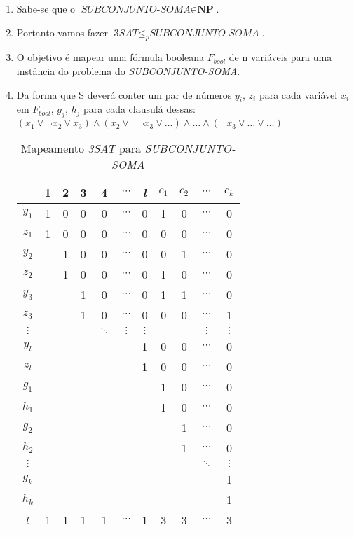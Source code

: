 \documentclass[12pt, a4paper]{article}
\begin{document}
\begin{enumerate}
  \item Sabe-se que o $\textit{SUBCONJUNTO-SOMA} \in \textbf{NP}$.
  \item Portanto vamos fazer $\textit{3SAT} \leqslant_{p} \textit{SUBCONJUNTO-SOMA}$.
  \item O objetivo é mapear uma fórmula booleana $F_{bool}$ de n variáveis para uma instância do problema do \textit{SUBCONJUNTO-SOMA}.
  \item Da forma que S deverá conter um par de números $y_i$, $z_i$ para cada variável $x_i$ em $F_{bool}$, $g_j$, $h_j$ para cada clausulá dessas: $(x_1 \vee \neg x_2 \vee x_3) \wedge (x_2 \vee \neg \neg x_3 \vee \ldots) \wedge \ldots \wedge (\neg x_3 \vee \ldots \vee \ldots)$


\begin{table}[h]\footnotesize
  \centering
\begin{tabular}{|c|c|c|c|c|c|c|c|c|c|c|}
\hline 
 & 1 & 2 & 3 & 4 & $\cdots$ & \textit{l} & $c_1$ & $c_2$ & $\cdots$ & $c_k$ \\ 
\hline 
$y_1$ & 1 & 0 & 0 & 0 & $\cdots$ & 0 & 1 & 0 & $\cdots$ & 0 \\ 
\hline 
$z_1$ & 1 & 0 & 0 & 0 & $\cdots$ & 0 & 0 & 0 & $\cdots$ & 0 \\ 
\hline 
$y_2$ &  & 1 & 0 & 0 & $\cdots$ & 0 & 0 & 1 & $\cdots$ & 0 \\ 
\hline 
$z_2$ &  & 1 & 0 & 0 & $\cdots$ & 0 & 1 & 0 & $\cdots$ & 0 \\ 
\hline 
$y_3$ &  &  & 1 & 0 & $\cdots$ & 0 & 1 & 1 & $\cdots$ & 0 \\ 
\hline 
$z_3$ &  &  & 1 & 0 & $\cdots$ & 0 & 0 & 0 & $\cdots$ & 1 \\ 
\hline 
$\vdots$ &  &  &  & $\ddots$ & $\vdots$ & $\vdots$ &  &  & $\vdots$ & $\vdots$ \\ 
\hline 
$y_l$ &  &  &  &  &  & 1 & 0 & 0 & $\cdots$ & 0 \\ 
\hline 
$z_l$ &  &  &  &  &  & 1 & 0 & 0 & $\cdots$ & 0 \\ 
\hline 
$g_1$ &  &  &  &  &  &  & 1 & 0 & $\cdots$ & 0 \\ 
\hline 
$h_1$ &  &  &  &  &  &  & 1 & 0 & $\cdots$ & 0 \\ 
\hline 
$g_2$ &  &  &  &  &  &  &  & 1 & $\cdots$ & 0 \\ 
\hline 
$h_2$ &  &  &  &  &  &  &  & 1 & $\cdots$ & 0 \\ 
\hline 
$\vdots$ &  &  &  &  &  &  &  &  & $\ddots$ & $\vdots$ \\ 
\hline 
$g_k$ &  &  &  &  &  &  &  &  &  & 1 \\ 
\hline 
$h_k$ &  &  &  &  &  &  &  &  &  & 1 \\ 
\hline 
$t$ & 1 & 1 & 1 & 1 & $\cdots$ & 1 & 3 & 3 & $\cdots$ & 3 \\ 
\hline
\end{tabular}
  \caption{Mapeamento \textit{3SAT} para \textit{SUBCONJUNTO-SOMA}}
\end{table}



\end{enumerate}
\end{document}
